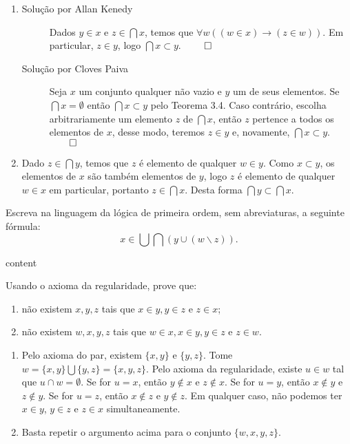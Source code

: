 \begin{enumerate}[label=(\alph{*})]
	\item
		\begin{description}
			\item[Solução por Allan Kenedy] Dados $y\in x$ e $z\in\bigcap x$, temos que $\forall w((w\in x)\to(z\in w))$. Em particular, $z\in y$, logo $\bigcap x\subset y$. $\qed$
			\item[Solução por Cloves Paiva] Seja $x$ um conjunto qualquer não vazio e $y$ um de seus elementos. Se $\bigcap x = \emptyset$ então $\bigcap x \subset y$ pelo Teorema 3.4. Caso contrário, escolha arbitrariamente um elemento $z$ de $\bigcap x$, então $z$ pertence a todos os elementos de $x$, desse modo, teremos $z \in y$ e, novamente, $\bigcap x \subset y$. $\qed$
		\end{description}
	\item Dado $z\in\bigcap y$, temos que $z$ é elemento de qualquer $w\in y$. Como $x\subset y$, os elementos de $x$ são também elementos de  $y$, logo $z$ é elemento de qualquer $w\in x$ em particular, portanto $z\in\bigcap x$. Desta forma $\bigcap y\subset\bigcap x$.
\end{enumerate}


\begin{exercicio}
	Escreva na linguagem da lógica de primeira ordem, sem abreviaturas, a seguinte fórmula:
	$$x\in\bigcup\bigcap(y\cup(w\backslash z)).$$
\end{exercicio}
\begin{solucao}
	content
\end{solucao}

\begin{exercicio}
	Usando o axioma da regularidade, prove que:
	\begin{enumerate}[label=(\alph{*})]
		\item não existem $x,y,z$ tais que $x\in y,y\in z$ e $z\in x$;
		\item não existem $w,x,y,z$ tais que $w\in x,x\in y,y\in z$ e $z\in w$.
	\end{enumerate}
\end{exercicio}
\begin{solucao}
	\begin{enumerate}[label=(\alph{*})]
		\item Pelo axioma do par, existem $\{x,y\}$ e $\{y,z\}$. Tome $w=\{x,y\}\bigcup \{y,z\}=\{x,y,z\}$. Pelo axioma da regularidade, existe $u\in w$ tal que $u\cap w=\emptyset$. Se for $u=x$, então $y\notin x$ e $z\notin x$. Se for $u=y$, então $x\notin y$ e $z\notin y$. Se for $u=z$, então $x\notin z$ e $y\notin z$. Em qualquer caso, não podemos ter $x\in y$, $y\in z$ e $z\in x$ simultaneamente.
		\item Basta repetir o argumento acima para o conjunto $\{w,x,y,z\}$.
	\end{enumerate}
\end{solucao}

